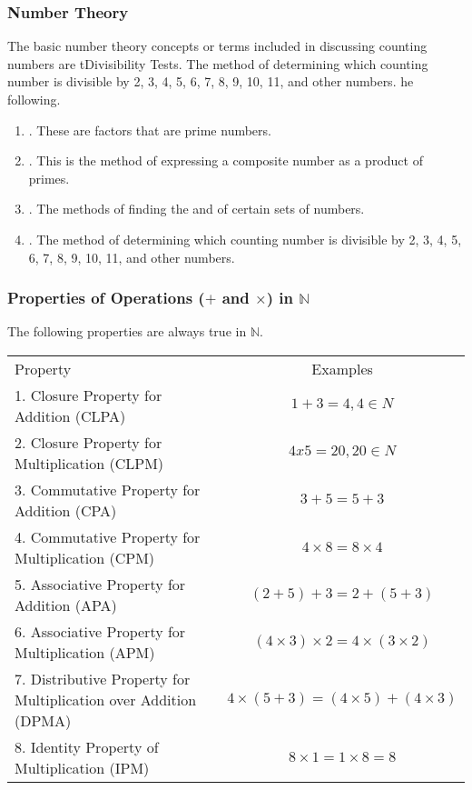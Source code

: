 \subsubsection*{Number Theory}
The basic number theory concepts or terms included in discussing counting numbers are tDivisibility Tests. The method of determining which counting number is divisible by 2, 3, 4, 5, 6,
7, 8, 9, 10, 11, and other numbers.
he
following.
\begin{enumerate}
\item {}. These are factors that are prime numbers.
\item {}. This is the method of expressing a composite number as a product of
primes.
\item {}. The methods of finding the  and  of certain sets of numbers.
\item {}. The method of determining which counting number is divisible by 2, 3, 4, 5, 6,
7, 8, 9, 10, 11, and other numbers.
\end{enumerate}
\subsubsection*{Properties of Operations ($+$ and $\times$) in $\mathbb{N}$}
The following properties are always true in $\mathbb{N}$.

\begin{tabularx}{\linewidth}{XC}
Property & Examples\\
1. Closure Property for Addition (CLPA) & $1 + 3 = 4, 4 \in N$\\
2. Closure Property for Multiplication (CLPM) & $4 x 5 = 20, 20 \in N$\\
3. Commutative Property for Addition (CPA) & $3+5=5+3$\\
4. Commutative Property for Multiplication (CPM) & $4\times 8=8\times 4$\\
5. Associative Property for Addition (APA) & $(2 + 5) + 3 = 2 + (5 + 3)$\\
6. Associative Property for Multiplication (APM) & $(4 \times 3) \times 2 = 4 \times (3 \times 2)$\\
7. Distributive Property for Multiplication over Addition (DPMA) & $4 \times (5 + 3) = (4 \times 5) + (4 \times 3)$\\
8. Identity Property of Multiplication (IPM) & $8\times1=1\times8=8$\\
\end{tabularx}

